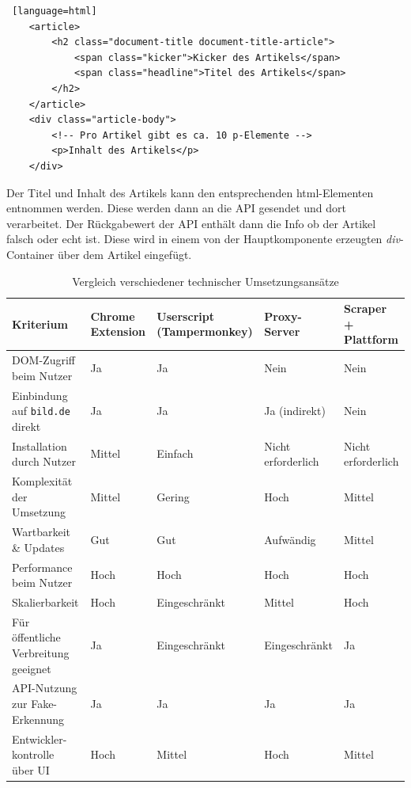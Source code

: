 \begin{lstlisting} [language=html]
    <article>
        <h2 class="document-title document-title-article">
            <span class="kicker">Kicker des Artikels</span>
            <span class="headline">Titel des Artikels</span>
        </h2>
    </article>
    <div class="article-body">
        <!-- Pro Artikel gibt es ca. 10 p-Elemente -->
        <p>Inhalt des Artikels</p>
    </div>
\end{lstlisting}

Der Titel und Inhalt des Artikels kann den entsprechenden html-Elementen entnommen werden.
Diese werden dann an die API gesendet und dort verarbeitet. 
Der Rückgabewert der API enthält dann die Info ob der Artikel falsch oder echt ist.
Diese wird in einem von der Hauptkomponente erzeugten \textit{div}-Container über dem Artikel eingefügt.

\begin{table}[ht]
    \centering
    \renewcommand{\arraystretch}{1.3}
    \begin{tabular}{|p{2.5cm}|p{2.5cm}|p{2.5cm}|p{2.5cm}|p{2.5cm}|}
        \hline
        \textbf{Kriterium} & \textbf{Chrome Extension} & \textbf{Userscript (Tampermonkey)} & \textbf{Proxy-Server} & \textbf{Scraper + Plattform} \\
        \hline
        DOM-Zugriff beim Nutzer & Ja & Ja & Nein & Nein \\
        \hline
        Einbindung auf \texttt{bild.de} direkt & Ja & Ja & Ja (indirekt) & Nein \\
        \hline
        Installation durch Nutzer & Mittel & Einfach & Nicht erforderlich & Nicht erforderlich\\
        \hline
        Komplexität der Umsetzung & Mittel & Gering & Hoch & Mittel \\
        \hline
        Wartbarkeit \& Updates & Gut & Gut & Aufwändig & Mittel \\
        \hline
        Performance beim Nutzer & Hoch & Hoch & Hoch & Hoch \\
        \hline
        Skalierbarkeit & Hoch & Eingeschränkt & Mittel & Hoch \\
        \hline
        Für öffentliche Verbreitung geeignet & Ja & Eingeschränkt & Eingeschränkt & Ja \\
        \hline
        API-Nutzung zur Fake-Erkennung & Ja & Ja & Ja & Ja \\
        \hline
        Entwickler-kontrolle über UI & Hoch & Mittel & Hoch & Mittel \\
        \hline
    \end{tabular}
    \caption{Vergleich verschiedener technischer Umsetzungsansätze}
    \label{table:technischeAnsaetze}
\end{table}

